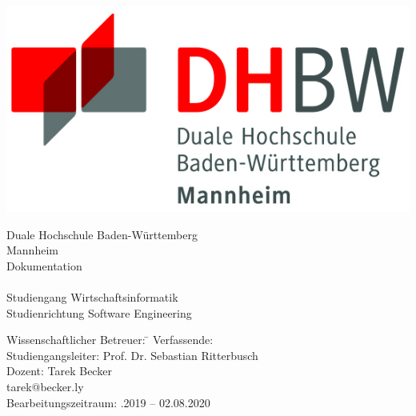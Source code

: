 \begin{titlepage}
\begin{minipage}{\textwidth}
		\vspace{-1cm}
        \begin{center}
            \includegraphics[scale=1.5]{img/logo.jpg}
        \end{center}
\end{minipage}
\vspace{4em}
\sffamily

\begin{center}
	\textsf{\Large{}Duale Hochschule Baden-W\"urttemberg\\[1.5mm] Mannheim}\\[4.5em]
	\textsf{\Large{}Dokumentation}\\[3mm]
	\textsf{\textbf{\Large{}\DerTitelDerArbeit}} \\[2.5cm]
	\textsf{\Large{}Studiengang Wirtschaftsinformatik}\\[3mm] \textsf{Studienrichtung Software Engineering}
	\vspace{2em}
\vfill

\begin{minipage}{\textwidth}

\begin{tabbing}
    Wissenschaftlicher Betreuer: \hspace{0.85cm}\=\kill
	Verfassende: \> \DerAutorDerArbeit \\[2mm]
	Studiengangsleiter: \> Prof. Dr. Sebastian Ritterbusch  \\[2mm]
	Dozent: \> Tarek Becker \\
	\> tarek@becker.ly \\[2mm]
	Bearbeitungszeitraum: .2019 -- 02.08.2020
\end{tabbing}
\end{minipage}

\end{center}
\end{titlepage}